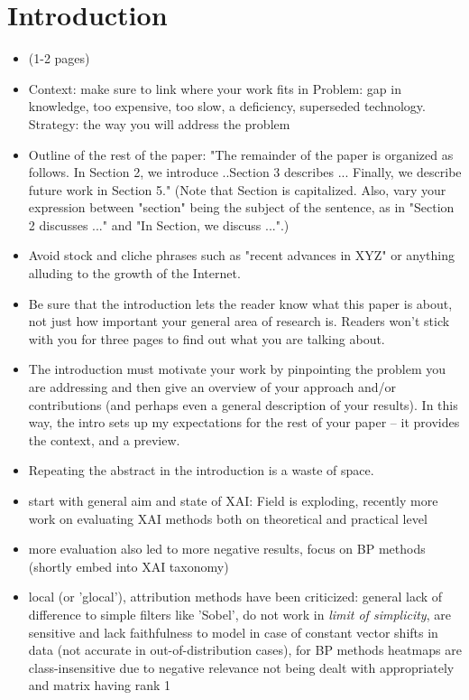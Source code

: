 \chapter{Introduction}\label{chapter:introduction}

\begin{itemize}
\color{red} 
    \item (1-2 pages)
    \item Context: make sure to link where your work fits in Problem: gap in knowledge, too expensive, too slow, a deficiency, superseded technology. Strategy: the way you will address the problem
    \item Outline of the rest of the paper: "The remainder of the paper is organized as follows. In Section 2, we introduce ..Section 3 describes ... Finally, we describe future work in Section 5." (Note that Section is capitalized. Also, vary your expression between "section" being the subject of the sentence, as in "Section 2 discusses ..." and "In Section, we discuss ...".)
    \item Avoid stock and cliche phrases such as "recent advances in XYZ" or anything alluding to the growth of the Internet. 
    \item Be sure that the introduction lets the reader know what this paper is about, not just how important your general area of research is. Readers won't stick with you for three pages to find out what you are talking about.
    \item The introduction must motivate your work by pinpointing the problem you are addressing and then give an overview of your approach and/or contributions (and perhaps even a general description of your results). In this way, the intro sets up my expectations for the rest of your paper -- it provides the context, and a preview.
    \item Repeating the abstract in the introduction is a waste of space.
\end{itemize}

\begin{itemize}
    \item start with general aim and state of XAI: Field is exploding, recently more work on evaluating XAI methods both on theoretical and practical level
    \item more evaluation also led to more negative results, focus on BP methods (shortly embed into XAI taxonomy)
    \item local (or 'glocal'), attribution methods have been criticized: general lack of difference to simple filters like 'Sobel', do not work in \textit{limit of simplicity}, are sensitive and lack faithfulness to model in case of constant vector shifts in data (not accurate in out-of-distribution cases), for BP methods heatmaps are class-insensitive due to negative relevance not being dealt with appropriately and matrix having rank 1
\end{itemize}


